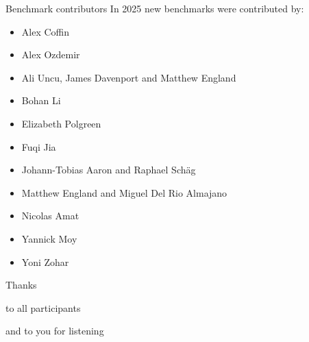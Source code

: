 \documentclass[table]{beamer}
\def\emph#1{\textcolor{MYblue}{#1}}
\begin{document}
\begin{frame}[shrink=0.95]{Benchmark contributors}
  In 2025 \emph{new benchmarks} were contributed by:

  \small
  \begin{itemize}
    \item  Alex Coffin
    \item  Alex Ozdemir
    \item  Ali Uncu, James Davenport and Matthew England
    \item  Bohan Li
    \item  Elizabeth Polgreen
    \item  Fuqi Jia
    \item  Johann-Tobias Aaron and Raphael Schäg
    \item  Matthew England and Miguel Del Rio Almajano
    \item  Nicolas Amat
    \item  Yannick Moy
    \item  Yoni Zohar
  \end{itemize}
\end{frame}

\begin{frame}

  \begin{center}
    \Large\emph{Thanks}
  \end{center}

  \begin{center}
    to all participants
  \end{center}

  \bigskip
  \pause


  \begin{center}
    and to you for listening
  \end{center}

\end{frame}
\end{document}
